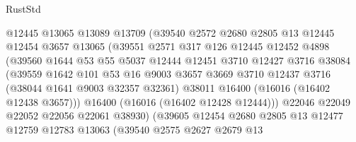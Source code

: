 \begin{lexlean}{RustStd}
\begin{coremodule}
                          @12445
                          @13065
                          @13089
                          @13709
                          (@39540
                            @2572
                            @2680
                            @2805
                            @13
                            @12445
                            @12454
                            @3657
                            @13065
                            (@39551
                              @2571
                              @317
                              @126
                              @12445
                              @12452
                              @4898
                              (@39560
                                @1644
                                @53
                                @55
                                @5037
                                @12444
                                @12451
                                @3710
                                @12427
                                @3716
                                @38084
                                (@39559
                                  @1642
                                  @101
                                  @53
                                  @16
                                  @9003
                                  @3657
                                  @3669
                                  @3710
                                  @12437
                                  @3716
                                  (@38044 @1641 @9003 @32357 @32361)
                                  @38011
                                  @16400
                                  (@16016 (@16402 @12438 @3657)))
                                @16400
                                (@16016 (@16402 @12428 @12444)))
                              @22046
                              @22049
                              @22052
                              @22056
                              @22061
                              @38930)
                            (@39605
                              @12454
                              @2680
                              @2805
                              @13
                              @12477
                              @12759
                              @12783
                              @13063
                              (@39540
                                @2575
                                @2627
                                @2679
                                @13

\end{coremodule}
\end{lexlean}
